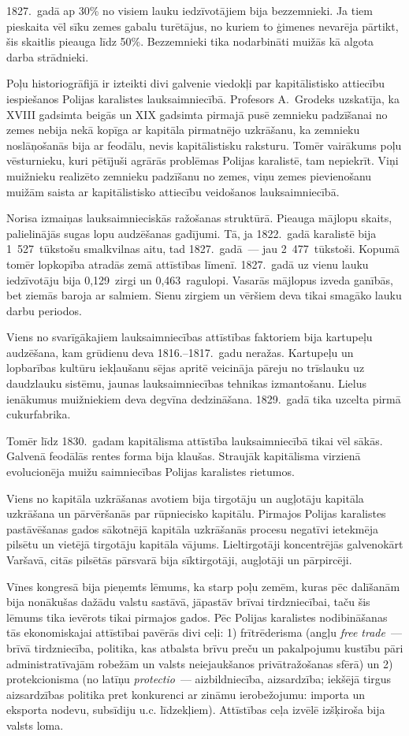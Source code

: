 \documentclass[twoside,a5paper,12pt,fleqn,openany]{extbook}
\newcommand{\entxti}[1]{\textit{\textenglish{#1}}}
\newcommand{\latxti}[1]{\textit{\textlatin{#1}}}
\begin{document}
1827.~gadā ap 30\% no visiem lauku iedzīvotājiem bija bezzemnieki. Ja tiem pieskaita vēl sīku zemes gabalu turētājus, no kuriem to ģimenes nevarēja pārtikt, šis skaitlis pieauga līdz 50\%. Bezzemnieki tika nodarbināti muižās kā algota darba strādnieki.

Poļu historiogrāfijā ir izteikti divi galvenie viedokļi par kapitālistisko attiecību iespiešanos Polijas karalistes lauksaimniecībā. Profesors A.~Grodeks uzskatīja, ka XVIII gadsimta beigās un XIX gadsimta pirmajā pusē zemnieku padzīšanai no zemes nebija nekā kopīga ar kapitāla pirmatnējo uzkrāšanu, ka zemnieku noslāņošanās bija ar feodālu, nevis kapitālistisku raksturu. Tomēr vairākums poļu vēsturnieku, kuri pētījuši agrārās problēmas Polijas karalistē, tam nepiekrīt. Viņi muižnieku realizēto zemnieku padzīšanu no zemes, viņu zemes pievienošanu muižām saista ar kapitālistisko attiecību veidošanos lauksaimniecībā.

Norisa izmaiņas lauksaimnieciskās ražošanas struktūrā. Pieauga mājlopu skaits, palielinājās sugas lopu audzēšanas gadījumi. Tā, ja 1822.~gadā karalistē bija 1~527~tūkstošu smalkvilnas aitu, tad 1827.~gadā~--- jau 2~477~tūkstoši. Kopumā tomēr lopkopība atradās zemā attīstības līmenī. 1827.~gadā uz vienu lauku iedzīvotāju bija 0,129~zirgi un 0,463~ragulopi. Vasarās mājlopus izveda ganībās, bet ziemās baroja ar salmiem. Sienu zirgiem un vēršiem deva tikai smagāko lauku darbu periodos.

Viens no svarīgākajiem lauksaimniecības attīstības faktoriem bija kartupeļu audzēšana, kam grūdienu deva 1816.--1817.~gadu neražas. Kartupeļu un lopbarības kultūru iekļaušanu sējas apritē veicināja pāreju no trīslauku uz daudzlauku sistēmu, jaunas lauksaimniecības tehnikas izmantošanu. Lielus ienākumus muižniekiem deva degvīna dedzināšana. 1829.~gadā tika uzcelta pirmā cukurfabrika.

Tomēr līdz 1830.~gadam kapitālisma attīstība lauksaimniecībā tikai vēl sākās. Galvenā feodālās rentes forma bija klaušas. Straujāk kapitālisma virzienā evolucionēja muižu saimniecības Polijas karalistes rietumos.

Viens no kapitāla uzkrāšanas avotiem bija tirgotāju un augļotāju kapitāla uzkrāšana un pārvēršanās par rūpniecisko kapitālu. Pirmajos Polijas karalistes pastāvēšanas gados sākotnējā kapitāla uzkrāšanās procesu negatīvi ietekmēja pilsētu un vietējā tirgotāju kapitāla vājums. Lieltirgotāji koncentrējās galvenokārt Varšavā, citās pilsētās pārsvarā bija sīktirgotāji, augļotāji un pārpircēji.

Vīnes kongresā bija pieņemts lēmums, ka starp poļu zemēm, kuras pēc dalīšanām bija nonākušas dažādu valstu sastāvā, jāpastāv brīvai tirdzniecībai, taču šis lēmums tika ievērots tikai pirmajos gados. Pēc Polijas karalistes nodibināšanas tās ekonomiskajai attīstībai pavērās divi ceļi: 1) frītrēderisma (angļu \entxti{free trade}~—brīvā tirdzniecība, politika, kas atbalsta brīvu preču un pakalpojumu kustību pāri administratīvajām robežām un valsts neiejaukšanos privātražošanas sfērā) un 2) protekcionisma (no latīņu \latxti{protectio}~--- aizbildniecība, aizsardzība; iekšējā tirgus aizsardzības politika pret konkurenci ar zināmu ierobežojumu: importa un eksporta nodevu, subsīdiju u.c. līdzekļiem). Attīstības ceļa izvēlē izšķiroša bija valsts loma.
\end{document}
